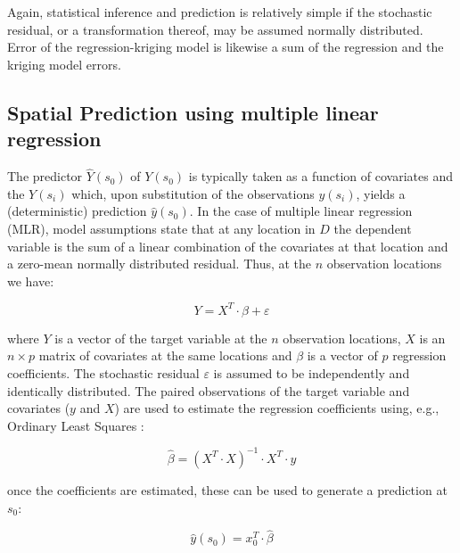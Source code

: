 \documentclass[graybox,natbib,nospthms,UStrade]{svmono}
\begin{document}
Again, statistical inference and prediction is relatively simple if the
stochastic residual, or a transformation thereof, may be assumed normally
distributed. Error of the regression-kriging model is likewise a sum of the
regression and the kriging model errors.

\hypertarget{spatial-prediction-using-multiple-linear-regression}{%
\subsection{Spatial Prediction using multiple linear regression}\label{spatial-prediction-using-multiple-linear-regression}}

The predictor \(\hat Y({{ s}_0})\) of \(Y({{ s}_0})\) is
typically taken as a function of covariates and the \(Y({ s}_i)\)
which, upon substitution of the observations \(y({ s}_i)\), yields a
(deterministic) prediction \(\hat y({{ s}_0})\). In the case of
multiple linear regression (MLR), model assumptions state
that at any location in \(D\) the dependent variable is the sum of a
linear combination of the covariates at that location and a zero-mean
normally distributed residual. Thus, at the \(n\) observation locations we
have:

\begin{equation}
{ Y} = { X}^{{ T}} \cdot { \beta} + { \varepsilon}
\label{eq:lm}
\end{equation}

where \({ Y}\) is a vector of the target variable at the \(n\)
observation locations, \({ X}\) is an \(n \times p\) matrix of covariates
at the same locations and \({ \beta}\) is a vector of \(p\) regression
coefficients. The stochastic residual \({ \varepsilon}\) is assumed to
be independently and identically distributed. The paired observations of
the target variable and covariates (\({ y}\) and \({ X}\)) are used to
estimate the regression coefficients using, e.g., Ordinary Least Squares
\citep{Kutner2004McGraw}:

\begin{equation}
\hat{{ \beta}}  = \left( {{{ X}}^{{ T}} \cdot {{ X}}} \right)^{ - {{ 1}}} \cdot
{{ X}}^{{ T}} \cdot {{ y}}
\label{eq:ols-betas}
\end{equation}

once the coefficients are estimated, these can be used to generate a
prediction at \({ s}_0\):

\begin{equation}
\hat y({ s}_0) = { x}_0^{ T} \cdot { \hat \beta}
\end{equation}
\end{document}

